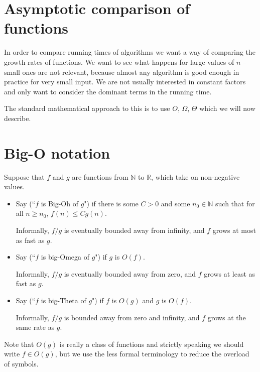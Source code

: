 \section{Asymptotic comparison of functions}
In order to compare running times of algorithms we want a way of comparing
the growth rates of functions. We want to see what happens for large values of $n$ 
-- small ones are not relevant, because almost any algorithm is good enough in practice for very small input. 
We are not usually interested in constant factors and only want to consider the dominant terms in the running time.

The standard mathematical approach to this is to use 
$O$, $\Omega$, $\Theta$ which we will now describe. 

\section{Big-O notation}
\begin{Definition}
Suppose that $f$ and $g$ are functions from $\mathbb{N}$ to $\mathbb{R}$, 
which take on non-negative values. 
\begin{itemize}
\item Say  (``$f$ is Big-Oh of $g$") if there is
some $C > 0$ and some $n_0 \in \mathbb{N}$ such that for all $n \geq
n_0$, $f(n) \leq C g(n)$. 

Informally, $f/g$ is eventually bounded away from infinity, and $f$ grows at most as fast as $g$.

\item Say  (``$f$ is big-Omega of $g$") if $g$ is
$O(f)$. 

Informally, $f/g$ is eventually bounded away from zero, and $f$ grows at least as fast as $g$.
\item Say  (``$f$ is big-Theta of $g$") if $f$ is 
$O(g)$ and $g$ is $O(f)$. 

Informally, $f/g$ is bounded away from zero and infinity, and $f$ grows at the same rate as $g$.
\end{itemize}
\end{Definition}

Note that $O(g)$ is really a class of functions and strictly speaking 
we should write $f \in O(g)$, but we use the less formal terminology to reduce the overload of symbols.


